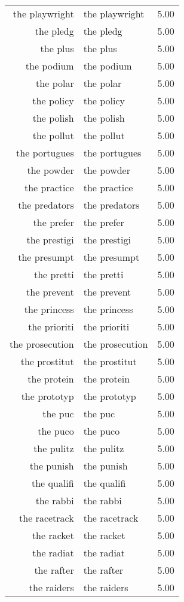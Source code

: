 \begin{table}[ht]
\begin{tabular}{rlr}
  the playwright & the playwright & 5.00 \\ 
  the pledg & the pledg & 5.00 \\ 
  the plus & the plus & 5.00 \\ 
  the podium & the podium & 5.00 \\ 
  the polar & the polar & 5.00 \\ 
  the policy & the policy & 5.00 \\ 
  the polish & the polish & 5.00 \\ 
  the pollut & the pollut & 5.00 \\ 
  the portugues & the portugues & 5.00 \\ 
  the powder & the powder & 5.00 \\ 
  the practice & the practice & 5.00 \\ 
  the predators & the predators & 5.00 \\ 
  the prefer & the prefer & 5.00 \\ 
  the prestigi & the prestigi & 5.00 \\ 
  the presumpt & the presumpt & 5.00 \\ 
  the pretti & the pretti & 5.00 \\ 
  the prevent & the prevent & 5.00 \\ 
  the princess & the princess & 5.00 \\ 
  the prioriti & the prioriti & 5.00 \\ 
  the prosecution & the prosecution & 5.00 \\ 
  the prostitut & the prostitut & 5.00 \\ 
  the protein & the protein & 5.00 \\ 
  the prototyp & the prototyp & 5.00 \\ 
  the puc & the puc & 5.00 \\ 
  the puco & the puco & 5.00 \\ 
  the pulitz & the pulitz & 5.00 \\ 
  the punish & the punish & 5.00 \\ 
  the qualifi & the qualifi & 5.00 \\ 
  the rabbi & the rabbi & 5.00 \\ 
  the racetrack & the racetrack & 5.00 \\ 
  the racket & the racket & 5.00 \\ 
  the radiat & the radiat & 5.00 \\ 
  the rafter & the rafter & 5.00 \\ 
  the raiders & the raiders & 5.00 \\ 

\end{tabular}
\end{table}
